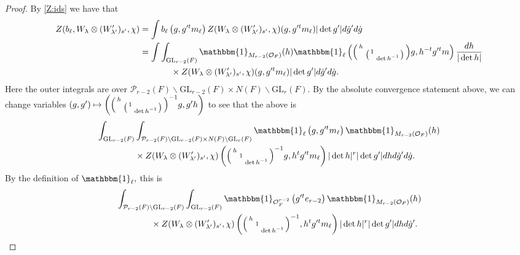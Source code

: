 \documentclass[12pt]{amsart}
\theoremstyle{remark}
\numberwithin{equation}{section}
\newcommand{\GL}{\mathrm{GL}}
\newcommand{\OO}{\mathcal{O}}
\theoremstyle{definition}
\newenvironment{psmatrix}
  {\left(\begin{smallmatrix}}
  {\end{smallmatrix}\right)}
\numberwithin{equation}{subsection}
\newcommand{\one}{\mathbbm{1}}
\begin{document}
\begin{proof}
By \eqref{Z:ids} we have that
\begin{align*}
Z(b_{\ell},W_\lambda\otimes (W'_{\lambda'})_{s'},\chi)&= \int b_\ell\left(g,g'^tm_{\ell}\right) 
    Z(W_\lambda\otimes (W'_{\lambda'})_{s'},\chi)(g,g'^tm_\ell)
    |\det g'|d\dot{g}'d\dot{g}\\
    &=\int\int_{\GL_{r-2}(F)}\one_{M_{r-2}(\OO_F)}(h)\one_{\ell}\left(\begin{psmatrix}h & \\ & \begin{psmatrix}1 & \\  & \det h^{-1}\end{psmatrix}
\end{psmatrix}g,h^{-t}g'^tm\right)\frac{dh}{|\det h|}\\
&\hspace{0.5 in}\times Z(W_\lambda\otimes (W'_{\lambda'})_{s'},\chi)(g,g'^tm_\ell)
    |\det g'|d\dot{g}'d\dot{g}.
\end{align*}
Here the outer integrals are over $\mathcal{P}_{r-2}(F) \backslash \GL_{r-2}(F) \times N(F) \backslash \GL_r(F).$  By the absolute convergence statement above, we can change variables $(g,g') \mapsto \left(\begin{psmatrix}h & \\ & \begin{psmatrix}1 & \\  & \det h^{-1}\end{psmatrix}\end{psmatrix}^{-1}g,g'h\right) $
to see that the above is 
\begin{align*}
\begin{split}
 \int_{\GL_{r-2}(F)}&\int_{\mathcal{P}_{r-2}(F) \backslash \GL_{r-2}(F) \times N(F) \backslash \GL_r(F)}\one_{\ell}\left(
g,g'^tm_\ell\right)\one_{M_{r-2}(\OO_F)}(h)\\& \times Z(W_\lambda\otimes (W'_{\lambda'})_{s'},\chi)\left(\begin{psmatrix} h & & \\ &1 & \\  & &\det h^{-1}\end{psmatrix}^{-1}g,h^tg'^tm_\ell\right) |\det h|^{r}
    |\det g'| dhd\dot{g}'d\dot{g}.
\end{split}
\end{align*} By the definition of $\one_\ell,$ this is
\begin{align} \label{before:comp}
\begin{split}
   & \int_{\mathcal{P}_{r-2}(F)\backslash\GL_{r-2}(F)} \int_{\GL_{r-2}(F)}\one_{\OO_F^{r-2}}\left(g'^te_{r-2}\right)\one_{M_{r-2}(\OO_F)}(h)\\
&\quad\quad\quad\quad\times Z(W_\lambda\otimes (W'_{\lambda'})_{s'},\chi)\left(\begin{psmatrix} h & & \\ &1 & \\  & &\det h^{-1}\end{psmatrix}^{-1},h^tg'^tm_\ell\right)|\det h|^{r}
    |\det g'| dhd\dot{g}'.
\end{split}
\end{align}


\end{proof}
\end{document}
